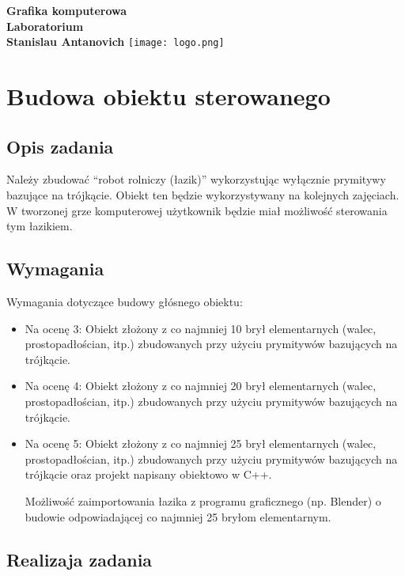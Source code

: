 \documentclass[a4paper, 12pt]{report}
\begin{document}
\begin{titlepage}
\begin{center}
		\vspace*{1cm}
		\textbf{Grafika komputerowa\\Laboratorium\\}
		\vspace{2cm}
		\textbf{Stanislau Antanovich}
		\vfill
		\vspace{0.8cm}
		\texttt{[image: logo.png]}
\end{center}
\end{titlepage}

\tableofcontents
\newpage

\chapter{Budowa obiektu sterowanego}
\section{Opis zadania}
Należy zbudować ``robot rolniczy (łazik)'' wykorzystując wyłącznie prymitywy bazujące na trójkącie. Obiekt ten będzie wykorzystywany na kolejnych zajęciach. W tworzonej grze komputerowej użytkownik będzie miał możliwość sterowania tym łazikiem.
\section{Wymagania}
Wymagania dotyczące budowy głósnego obiektu:
\begin{itemize}
\item Na ocenę 3: Obiekt złożony z co najmniej 10 brył elementarnych (walec, prostopadłościan, itp.) zbudowanych przy użyciu prymitywów bazujących na trójkącie.
\item Na ocenę 4: Obiekt złożony z co najmniej 20 brył elementarnych (walec, prostopadłościan, itp.) zbudowanych przy użyciu prymitywów bazujących na trójkącie.
\item Na ocenę 5: Obiekt złożony z co najmniej 25 brył elementarnych (walec, prostopadłościan, itp.) zbudowanych przy użyciu prymitywów bazujących na trójkącie oraz projekt napisany obiektowo w C++.

Możliwość zaimportowania łazika z programu graficznego (np. Blender) o budowie odpowiadającej co najmniej 25 bryłom elementarnym.
\end{itemize}

\section{Realizaja zadania}
\end{document}
